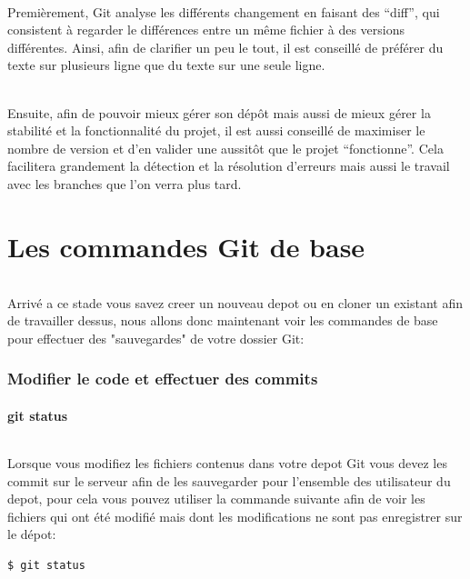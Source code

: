 \documentclass[french, a4paper, 12pt, titlepage]{article}
\begin{document}
\paragraph{} Premièrement, Git analyse les différents changement en faisant des ``diff'', qui consistent à regarder le différences entre un même fichier à des versions différentes. Ainsi, afin de clarifier un peu le tout, il est conseillé de préférer du texte sur plusieurs ligne que du texte sur une seule ligne.
\paragraph{} Ensuite, afin de pouvoir mieux gérer son dépôt mais aussi de mieux gérer la stabilité et la fonctionnalité du projet, il est aussi conseillé de maximiser le nombre de version et d'en valider une aussitôt que le projet ``fonctionne''. Cela facilitera grandement la détection et la résolution d'erreurs mais aussi le travail avec les branches que l'on verra plus tard.

\part{Les commandes Git de base}
\paragraph{}Arrivé a ce stade vous savez creer un nouveau depot ou en cloner un existant afin de travailler dessus, nous allons donc maintenant voir les commandes de base pour effectuer des "sauvegardes" de votre dossier Git:

\section{Modifier le code et effectuer des commits}
\subsection{git status}
\paragraph{}Lorsque vous modifiez les fichiers contenus dans votre depot Git vous devez les commit sur le serveur afin de les sauvegarder pour l'ensemble des utilisateur du depot, pour cela vous pouvez utiliser la commande suivante afin de voir les fichiers qui ont été modifié mais dont les modifications ne sont pas enregistrer sur le dépot:
\begin{lstlisting}
$ git status
\end{lstlisting}
\end{document}
